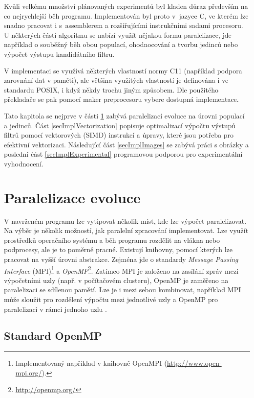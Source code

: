 Kvůli velkému množství plánovaných experimentů byl kladen důraz především na co nejrychlejší běh programu. Implementován byl proto v~jazyce C, ve kterém lze snadno pracovat i s~assemblerem a rozšiřujícími instrukčními sadami procesoru. U některých částí algoritmu se nabízí využít nějakou formu paralelizace, jde například o souběžný běh obou populací, ohodnocování a tvorbu jedinců nebo výpočet výstupu kandidátního filtru.

V implementaci se využívá některých vlastností normy C11 (například podpora zarovnání dat v paměti), ale většina využitých vlastností je definována i ve standardu POSIX, i když někdy trochu jiným způsobem. Dle použitého překladače se pak pomocí maker preprocesoru vybere dostupná implementace.

Tato kapitola se nejprve v části \ref{secImplParalelization} zabývá paralelizací evoluce na úrovni populací a jedinců. Část \ref{secImplVectorization} popisuje optimalizací výpočtu výstupů filtrů pomocí vektorových (SIMD) instrukcí a úpravy, které jsou potřeba pro efektivní vektorizaci. Následující část \ref{secImplImages} se zabývá práci s obrázky a poslední část \ref{secImplExperimental} programovou podporou pro experimentální vyhodnocení.

\section{Paralelizace evoluce}
\label{secImplParalelization}

V navrženém programu lze vytipovat několik míst, kde lze výpočet paralelizovat. Na výběr je několik možností, jak paralelní zpracování implementovat. Lze využít prostředků operačního systému a běh programu rozdělit na vlákna nebo podprocesy, ale je to poměrně pracné. Existují knihovny, pomocí kterých lze pracovat na vyšší úrovni abstrakce. Zejména jde o standardy \emph{Message Passing Interface} (MPI)\footnote{Implementovaný například v knihovně OpenMPI (\url{http://www.open-mpi.org/}).} a \emph{OpenMP}\footnote{\url{http://openmp.org/}}. Zatímco MPI je založeno na zasílání zpráv mezi výpočetními uzly (např. v počítačovém clusteru), OpenMP je zaměřeno na paralelizaci se sdílenou pamětí. Lze je i mezi sebou kombinovat, například MPI může sloužit pro rozdělení výpočtu mezi jednotlivé uzly a OpenMP pro paralelizaci v rámci jednoho uzlu \cite{Quinn}.


\subsection{Standard OpenMP}

